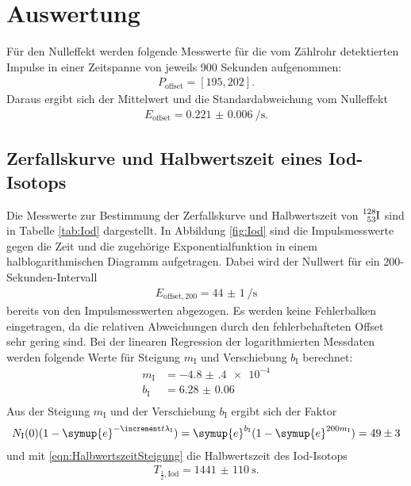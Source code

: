 \section{Auswertung}
\label{sec:Auswertung}

Für den Nulleffekt werden folgende Messwerte für die vom Zählrohr detektierten
Impulse in einer Zeitspanne von
jeweils 900 Sekunden aufgenommen:
\begin{align*}
  P_\text{offset} = [195,202].
\end{align*}
Daraus ergibt sich der Mittelwert und die Standardabweichung vom Nulleffekt
\begin{align*}
  E_\text{offset} = \SI{0.221(6)}{\per\second}.
\end{align*}

\subsection{Zerfallskurve und Halbwertszeit eines Iod-Isotops}

Die Messwerte zur Bestimmung der Zerfallskurve und Halbwertszeit von
$\ce{^{128}_{53}I}$ sind in Tabelle \ref{tab:Iod} dargestellt.
In Abbildung \ref{fig:Iod} sind die Impulsmesswerte gegen die Zeit und die
zugehörige Exponentialfunktion in einem halblogarithmischen Diagramm aufgetragen.
Dabei wird der Nullwert für ein 200-Sekunden-Intervall
\begin{align}
  E_{\text{offset},200} = \SI{44(1)}{\per\second}
\end{align}
bereits von
den Impulsmesswerten abgezogen. Es werden keine Fehlerbalken eingetragen,
da die relativen Abweichungen durch den fehlerbehafteten Offset sehr gering sind.
Bei der linearen Regression der logarithmierten Messdaten werden folgende Werte
für Steigung $m_\text{I}$ und Verschiebung $b_\text{I}$ berechnet:
\begin{align*}
  m_\text{I} & = -\num{4.8(4)e-4}\\
  b_\text{I} & = \num{6.28(6)}\\
\end{align*}
Aus der Steigung $m_\text{I}$ und der Verschiebung $b_\text{I}$ ergibt sich der Faktor
\begin{align}
  N_\text{I}(0)(1-\symup{e}^{-\increment t \lambda_\text{I}}) = \symup{e}^{b_\text{I}} (1-\symup{e}^{200 {m_\text{I}}})
  = \num{49(3)}
\end{align}
und mit \eqref{eqn:HalbwertszeitSteigung} die Halbwertszeit des Iod-Isotops
\begin{align*}
  T_{\frac{1}{2},\text{Iod}} = \SI{1441(110)}{\second}.
\end{align*}

